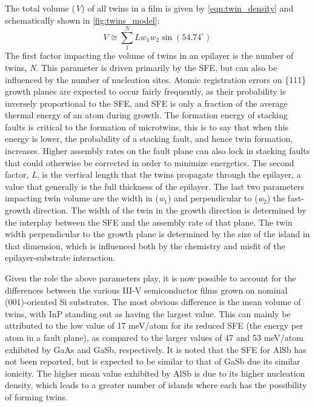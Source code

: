 The total volume (\textit{V}) of all twins in a film is given by \cref{eqn:twin_density} and schematically shown in \cref{fig:twins_model}:
\begin{equation}\label{eqn:twin_density}
V \cong \sum\limits_{1}^{N} L w_1 w_2 \sin(54.74^{\circ})
\end{equation}
The first factor impacting the volume of twins in an epilayer is the number of twins, \textit{N}. This parameter is driven primarily by the SFE, but can also be influenced by the number of nucleation sites. Atomic registration errors on \{111\} growth planes are expected to occur fairly frequently, as their probability is inversely proportional to the SFE, and SFE is only a fraction of the average thermal energy of an atom during growth\cite{Ernst1989}. The formation energy of stacking faults is critical to the formation of microtwins, this is to say that when this energy is lower, the probability of a stacking fault, and hence twin formation, increases\cite{Oda2007}. Higher assembly rates on the fault plane can also lock in stacking faults that could otherwise be corrected in order to minimize energetics. The second factor, \textit{L}, is the vertical length that the twins propagate through the epilayer, a value that generally is the full thickness of the epilayer. The last two parameters impacting twin volume are the width in (\textit{w}$_1$) and perpendicular to (\textit{w}$_2$) the fast-growth direction. The width of the twin in the growth direction is determined by the interplay between the SFE and the assembly rate of that plane. The twin width perpendicular to the growth plane is determined by the size of the island in that dimension, which is influenced both by the chemistry and misfit of the epilayer-substrate interaction.

Given the role the above parameters play, it is now possible to account for the differences between the various III-V semiconductor films grown on nominal (001)-oriented Si substrates. The most obvious difference is the mean volume of twins, with InP standing out as having the largest value. This can mainly be attributed to the low value of 17 meV/atom for its reduced SFE (the energy per atom in a fault plane)\cite{Gottschalk1978}, as compared to the larger values of 47 and 53 meV/atom exhibited by GaAs and GaSb, respectively\cite{Gottschalk1978}. It is noted that the SFE for AlSb has not been reported, but is expected to be similar to that of GaSb due its similar ionicity\cite{Holt2007b}. The higher mean value exhibited by AlSb is due to its higher nucleation density\cite{Akahane2004}, which leads to a greater number of islands where each has the possibility of forming twins.

